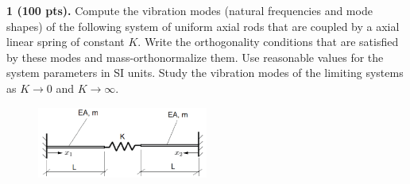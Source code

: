 \pagestyle{fancy}
\setlength{\headheight}{16pt}
\fancyhead{} %
\fancyfoot{} %
\fancyfoot[C]{\thepage}

\begin{problem}
    \textbf{1 (100 pts).} Compute the vibration modes (natural frequencies and mode shapes) of the following system of uniform axial rods that are coupled by a axial linear spring of constant $K$. 
    Write the orthogonality conditions that are satisfied by these modes and mass-orthonormalize them. 
    Use reasonable values for the system parameters in SI units. Study the vibration modes of the limiting systems as $K\rightarrow 0$ and $K\rightarrow \infty$.
\end{problem}
\begin{figure}[!ht]
    \centering
    \includegraphics[width=0.5\textwidth]{homework/hw3/assets/hw3_p1.png}
\end{figure}

